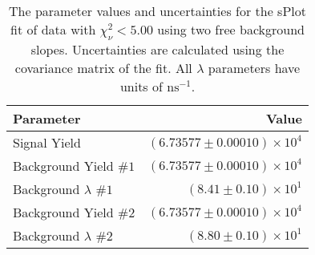 
\begin{table}[ht]
    \begin{center}
        \begin{tabular}{lr}\toprule
            Parameter & Value \\\midrule
            Signal Yield & $(6.73577 \pm 0.00010) \times 10^{4}$ \\
            Background Yield $\#1$ & $(6.73577 \pm 0.00010) \times 10^{4}$ \\
            Background $\lambda$ $\#1$ & $(8.41 \pm 0.10) \times 10^{1}$ \\
            Background Yield $\#2$ & $(6.73577 \pm 0.00010) \times 10^{4}$ \\
            Background $\lambda$ $\#2$ & $(8.80 \pm 0.10) \times 10^{1}$ \\\bottomrule
        \end{tabular}
        \caption{The parameter values and uncertainties for the sPlot fit of data with $\chi^2_\nu < 5.00$ using two free background slopes. Uncertainties are calculated using the covariance matrix of the fit. All $\lambda$ parameters have units of $\si{\nano\second}^{-1}$.}\label{tab:splot-fit-results-chisqdof-5.00-free-2}
    \end{center}
\end{table}
